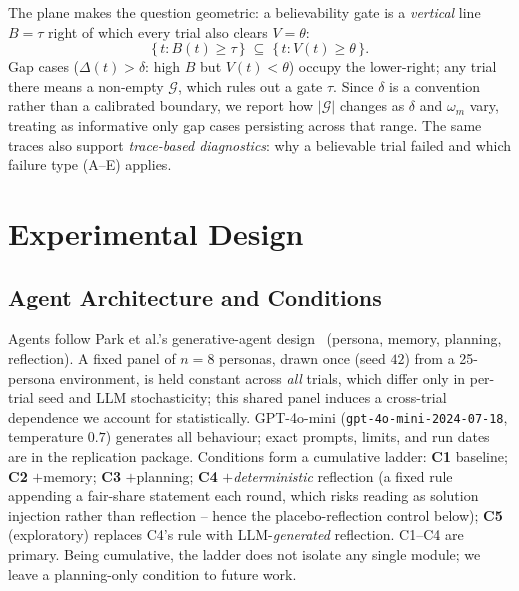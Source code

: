 \documentclass[runningheads]{llncs}
\begin{document}
The plane makes the question geometric: a believability gate is a \emph{vertical} line $B=\tau$
right of which every trial also clears $V=\theta$:
\[
\{\,t : B(t)\geq\tau\,\} \;\subseteq\; \{\,t : V(t)\geq\theta\,\}.
\]
Gap cases ($\Delta(t)>\delta$: high $B$ but $V(t)<\theta$) occupy the lower-right; any trial there
means a non-empty $\mathcal{G}$, which rules out a gate $\tau$. Since $\delta$ is a convention
rather than a calibrated boundary, we report how $|\mathcal{G}|$ changes as $\delta$ and $\omega_m$ vary,
treating as informative only gap cases persisting across that range. The same traces also support
\emph{trace-based diagnostics}: why a believable trial failed and which failure type (A--E)
applies.




\section{Experimental Design}\label{sec:design}

\subsection{Agent Architecture and Conditions}
Agents follow Park et al.'s generative-agent design~\cite{park2023generative} (persona, memory,
planning, reflection). A fixed panel of $n=8$ personas, drawn once (seed $42$) from a 25-persona
environment, is held constant across \emph{all} trials, which differ only in per-trial seed and
LLM stochasticity; this shared panel induces a cross-trial dependence we account for statistically.
GPT-4o-mini (\texttt{gpt-4o-mini-2024-07-18}, temperature $0.7$) generates all behaviour; exact
prompts, limits, and run dates are in the replication package. Conditions form a cumulative
ladder: \textbf{C1} baseline; \textbf{C2} $+$memory; \textbf{C3} $+$planning; \textbf{C4}
$+$\emph{deterministic} reflection (a fixed rule appending a fair-share statement each round,
which risks reading as solution injection rather than reflection -- hence the placebo-reflection
control below); \textbf{C5} (exploratory) replaces C4's rule with LLM-\emph{generated} reflection.
C1--C4 are primary. Being cumulative, the ladder does not isolate any single module; we leave a
planning-only condition to future work.
\end{document}
